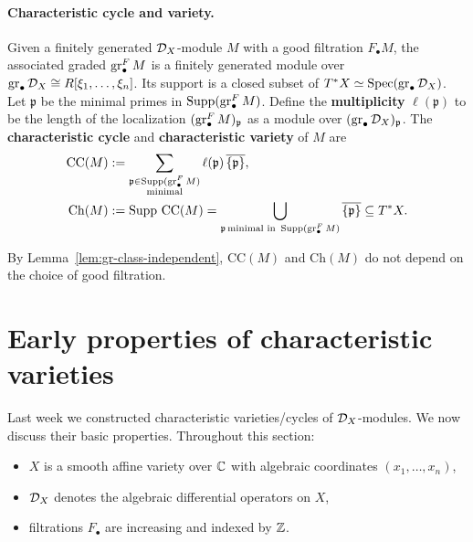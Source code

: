 \paragraph{Characteristic cycle and variety.}
Given a finitely generated $\mathcal{D}_X$-module $M$ with a good filtration $F_\bullet M$,
the associated graded $\operatorname{gr}^{F}_\bullet M$ is a finitely generated module over
$\operatorname{gr}_\bullet \mathcal{D}_X\cong R[\xi_1,\dots,\xi_n]$. Its support is a closed subset of
$T^{\ast}X\simeq\operatorname{Spec}(\operatorname{gr}_\bullet \mathcal{D}_X)$. \\
Let {\it $\mathfrak p$} be the minimal primes in
$\operatorname{Supp}(\operatorname{gr}^{F}_\bullet M)$. Define the \textbf{multiplicity} $\ell(\mathfrak p)$ to be the length of
the localization $(\operatorname{gr}^{F}_\bullet M)_{\mathfrak p}$ as a module over $(\operatorname{gr}_\bullet \mathcal{D}_X)_{\mathfrak p}$. The
\textbf{characteristic cycle}
and \textbf{characteristic variety}
of $M$ are
\begin{align*}
    \mathrm{CC}(M) & := \sum_{\substack{\mathfrak p\in\operatorname{Supp}(\operatorname{gr}^{F}_\bullet M) \\ \text{minimal}}}
    \ell(\mathfrak p)\,\overline{\{\mathfrak p\}},                                           \\
    \mathrm{Ch}(M) & := \operatorname{Supp}\,\mathrm{CC}(M)
    = \bigcup_{\mathfrak p\,\text{minimal in }\operatorname{Supp}(\operatorname{gr}^{F}_\bullet M)} \overline{\{\mathfrak p\}}
    \subseteq T^{\ast}X.
\end{align*}

By Lemma~\ref{lem:gr-class-independent}, $\mathrm{CC}(M)$ and $\mathrm{Ch}(M)$ do not depend on the
choice of good filtration.

\section{Early properties of characteristic varieties}
Last week we constructed characteristic varieties/cycles of $\mathcal{D}_X$-modules. We now discuss their
basic properties. Throughout this section:
\begin{itemize}
    \item $X$ is a smooth affine variety over $\mathbb{C}$ with algebraic coordinates $(x_1,\dots,x_n)$,
    \item $\mathcal{D}_X$ denotes the algebraic differential operators on $X$,
    \item filtrations $F_\bullet$ are increasing and indexed by $\mathbb{Z}$.
\end{itemize}

